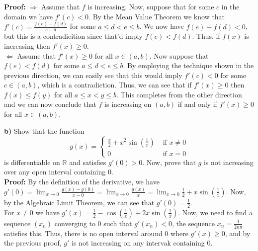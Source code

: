 \documentclass{article}
\begin{document}
	\textbf{Proof:} $\Longrightarrow$ Assume that $f$ is increasing. Now, suppose that for some $c$ in the domain we have $f'(c) < 0$. By the Mean Value Theorem we know that $f'(c) = \frac{f(e) - f(d)}{e - d}$ for some $a \leq d < e \leq b$. We now have $f(e) - f(d) < 0$, but this is a contradicition since that'd imply $f(e) < f(d)$. Thus, if $f(x)$ is increasing then $f'(x) \geq 0$. \\ 
	$\Longleftarrow$ Assume that $f'(x) \geq 0$ for all $x \in (a, b)$. Now suppose that $f(e) < f(d)$ for some $a \leq d < e \leq b$. By employing the technique shown in the previous direction, we can easily see that this would imply $f'(c) < 0$ for some $c \in (a, b)$, which is a contradiction. Thus, we can see that if $f'(x) \geq 0$ then $f(x) \leq f(y)$ for all $a \leq x < y \leq b$. This completes from the other direction and we can now conclude that $f$ is increasing on $(a, b)$ if and only if $f'(x) \geq 0$ for all $x \in (a, b)$. \\
	\begin{itemize}
		\textbf{b)} Show that the function
		$$g(x) = \begin{cases}
			\frac{x}{2} + x^2\sin(\frac{1}{x}) & \text{ if } x \neq 0 \\
			0 & \text{ if } x = 0
		\end{cases}$$
		is differentiable on $\mathbb{R}$ and satisfies $g'(0) > 0$. Now, prove that $g$ is not increasing over any open interval containing 0. \\
		\textbf{Proof:} By the definition of the derivative, we have $g'(0) = \lim_{x\to 0} \frac{g(x) - g(0)}{x - 0} = \lim_{x \to 0} \frac{g(x)}{x} = \lim_{x \to 0} \frac{1}{2} + x\sin(\frac{1}{x})$. Now, by the Algebraic Limit Theorem, we can see that $g'(0) = \frac{1}{2}$. \\
		For $x \neq 0$ we have $g'(x) = \frac{1}{2} - \cos(\frac{1}{x}) + 2x\sin(\frac{1}{x})$. Now, we need to find a sequence $(x_n)$ converging to 0 such that $g'(x_n) < 0$, the sequence $x_n = \frac{1}{2n\pi}$ satisfies this. Thus, there is no open interval around 0 where $g'(x) \geq 0$, and by the previous proof, $g'$ is not increasing on any intervak containing 0.
	\end{itemize}
\end{document}
